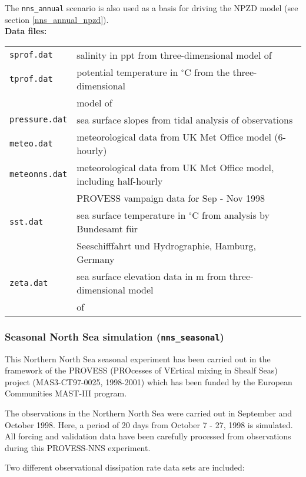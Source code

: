 The {\tt nns\_annual} scenario is also used as a basis for
driving the NPZD model (see section \ref{nns_annual_npzd}).
\\

{\bf Data files:}

\begin{tabular}{ll}
{\tt sprof.dat}         &  salinity in ppt from three-dimensional model
of \cite{Pohlmann96}\\ 
{\tt tprof.dat}         &  potential temperature in $^{\circ}$C from the three-dimensional \\
                        &  model of \cite{Pohlmann96}\\ 
{\tt pressure.dat} & sea surface slopes from tidal analysis of observations \\
{\tt meteo.dat} & meteorological data from UK Met Office model (6-hourly) \\
{\tt meteonns.dat} & meteorological data from UK Met Office model, including 
half-hourly \\ & PROVESS vampaign data for Sep - Nov 1998 \\
{\tt sst.dat} & sea surface temperature in $^{\circ}$C
from analysis by Bundesamt f\"ur \\ & Seeschifffahrt und
Hydrographie, Hamburg, Germany \\
{\tt zeta.dat} & sea surface elevation data in m from three-dimensional model
\\ & 
of \cite{Pohlmann96}
\end{tabular}


\subsubsection{Seasonal North Sea simulation ({\tt nns\_seasonal})}\label{nns_seasonal}

This Northern North Sea seasonal experiment has been carried out in the 
framework
of the PROVESS (PROcesses of VErtical mixing in Shealf Seas) project 
(MAS3-CT97-0025, 1998-2001) which has been funded by the European Communities 
MAST-III program.

The observations in the Northern North Sea were carried out in September 
and October 1998.
Here, a period of 20 days from October 7 - 27, 1998 is simulated.
All forcing and validation data have been carefully processed from
observations during this PROVESS-NNS experiment. 

Two different observational dissipation rate data sets are included:


